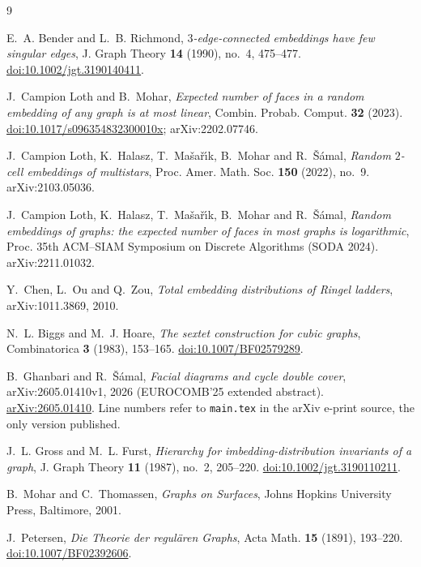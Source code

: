 \documentclass[11pt]{amsart}
\begin{document}
\begin{thebibliography}{9}

E.~A. Bender and L.~B. Richmond,
\emph{$3$-edge-connected embeddings have few singular edges},
J. Graph Theory \textbf{14} (1990), no.~4, 475--477.
\href{https://doi.org/10.1002/jgt.3190140411}{doi:10.1002/jgt.3190140411}.

J.~Campion Loth and B.~Mohar,
\emph{Expected number of faces in a random embedding of any graph is at most
linear},
Combin. Probab. Comput. \textbf{32} (2023).
\href{https://doi.org/10.1017/s096354832300010x}{doi:10.1017/s096354832300010x};
arXiv:2202.07746.

J.~Campion Loth, K.~Halasz, T.~Ma\v{s}a\v{r}\'{\i}k, B.~Mohar and
R.~\v{S}\'{a}mal,
\emph{Random $2$-cell embeddings of multistars},
Proc. Amer. Math. Soc. \textbf{150} (2022), no.~9.
arXiv:2103.05036.

J.~Campion Loth, K.~Halasz, T.~Ma\v{s}a\v{r}\'{\i}k, B.~Mohar and
R.~\v{S}\'{a}mal,
\emph{Random embeddings of graphs: the expected number of faces in most graphs
is logarithmic},
Proc. 35th ACM--SIAM Symposium on Discrete Algorithms (SODA 2024).
arXiv:2211.01032.

Y.~Chen, L.~Ou and Q.~Zou,
\emph{Total embedding distributions of Ringel ladders},
arXiv:1011.3869, 2010.

N.~L. Biggs and M.~J. Hoare,
\emph{The sextet construction for cubic graphs},
Combinatorica \textbf{3} (1983), 153--165.
\href{https://doi.org/10.1007/BF02579289}{doi:10.1007/BF02579289}.

B.~Ghanbari and R.~\v{S}\'{a}mal,
\emph{Facial diagrams and cycle double cover},
arXiv:2605.01410v1, 2026 (EUROCOMB'25 extended abstract).
\href{https://arxiv.org/abs/2605.01410}{arXiv:2605.01410}.
Line numbers refer to \texttt{main.tex} in the arXiv e-print source, the only
version published.

J.~L. Gross and M.~L. Furst,
\emph{Hierarchy for imbedding-distribution invariants of a graph},
J. Graph Theory \textbf{11} (1987), no.~2, 205--220.
\href{https://doi.org/10.1002/jgt.3190110211}{doi:10.1002/jgt.3190110211}.

B.~Mohar and C.~Thomassen,
\emph{Graphs on Surfaces},
Johns Hopkins University Press, Baltimore, 2001.

J.~Petersen,
\emph{Die Theorie der regul\"{a}ren Graphs},
Acta Math. \textbf{15} (1891), 193--220.
\href{https://doi.org/10.1007/BF02392606}{doi:10.1007/BF02392606}.

\end{thebibliography}
\end{document}
